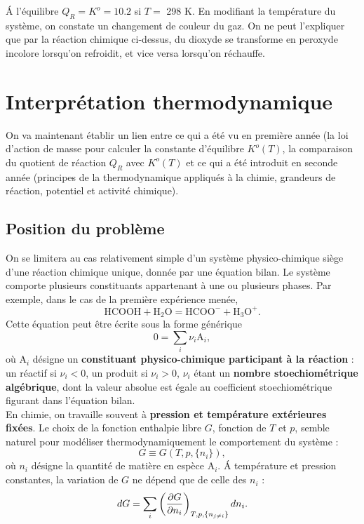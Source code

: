 \documentclass[11pt,a4paper]{report}
\begin{document}
\'A l'équilibre $Q_R = K^o = 10.2$ si $T = $ 298 K. En modifiant la température du système, on constate un changement de couleur du gaz. On ne peut l'expliquer que par la réaction chimique ci-dessus, du dioxyde se transforme en peroxyde incolore lorsqu'on refroidit, et vice versa lorsqu'on réchauffe. 
 		
\newpage
\section{Interprétation thermodynamique}

On va maintenant établir un lien entre ce qui a été vu en première année (la loi d'action de masse pour calculer la constante d'équilibre $K^o(T)$, la comparaison du quotient de réaction $Q_R$ avec $K^o(T)$ et ce qui a été introduit en seconde année (principes de la thermodynamique appliqués à la chimie, grandeurs de réaction, potentiel et activité chimique). 

\subsection{Position du problème}

On se limitera au cas relativement simple d'un système physico-chimique siège d'une réaction chimique unique, donnée par une équation bilan. Le système comporte plusieurs constituants appartenant à une ou plusieurs phases. Par exemple, dans le cas de la première expérience menée,
\begin{equation}
	\text{HCOOH} + \text{H}_2\text{O} = \text{HCOO}^- + \text{H}_3\text{O}^+.
\end{equation}
Cette équation peut être écrite sous la forme générique
\begin{equation}
	0 = \sum_i \nu_i \text{A}_i,
\end{equation}
où $\text{A}_i$ désigne un \textbf{constituant physico-chimique participant à la réaction} : un réactif si $\nu_i < 0$, un produit si $\nu_i > 0$, $\nu_i$ étant un \textbf{nombre stoechiométrique algébrique}, dont la valeur absolue est égale au coefficient stoechiométrique figurant dans l'équation bilan.\\

En chimie, on travaille souvent à \textbf{pression et température extérieures fixées}. Le choix de la fonction enthalpie libre $G$, fonction de $T$ et $p$, semble naturel pour modéliser thermodynamiquement le comportement du système :
\begin{equation}
	G \equiv G(T,p,\{n_i\}),
\end{equation}
où $n_i$ désigne la quantité de matière en espèce $\text{A}_i$. \'A température et pression constantes, la variation de $G$ ne dépend que de celle des $n_i$ :
\begin{equation}
	dG = \sum_i \left(\frac{\partial G}{\partial n_i}\right)_{T,p,\{n_{j\neq i}\}}dn_i.\\
	\label{eq:1_dG}
\end{equation}
\end{document}
